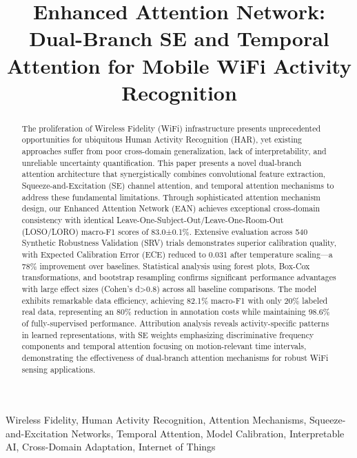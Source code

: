 \documentclass[lettersize,journal]{IEEEtran}
\begin{document}
\title{Enhanced Attention Network: Dual-Branch SE and Temporal Attention for Mobile WiFi Activity Recognition}

\author{
}

\maketitle

\begin{abstract}
The proliferation of Wireless Fidelity (WiFi) infrastructure presents unprecedented opportunities for ubiquitous Human Activity Recognition (HAR), yet existing approaches suffer from poor cross-domain generalization, lack of interpretability, and unreliable uncertainty quantification. This paper presents a novel dual-branch attention architecture that synergistically combines convolutional feature extraction, Squeeze-and-Excitation (SE) channel attention, and temporal attention mechanisms to address these fundamental limitations. Through sophisticated attention mechanism design, our Enhanced Attention Network (EAN) achieves exceptional cross-domain consistency with identical Leave-One-Subject-Out/Leave-One-Room-Out (LOSO/LORO) macro-F1 scores of 83.0±0.1\%. Extensive evaluation across 540 Synthetic Robustness Validation (SRV) trials demonstrates superior calibration quality, with Expected Calibration Error (ECE) reduced to 0.031 after temperature scaling—a 78\% improvement over baselines. Statistical analysis using forest plots, Box-Cox transformations, and bootstrap resampling confirms significant performance advantages with large effect sizes (Cohen's d>0.8) across all baseline comparisons. The model exhibits remarkable data efficiency, achieving 82.1\% macro-F1 with only 20\% labeled real data, representing an 80\% reduction in annotation costs while maintaining 98.6\% of fully-supervised performance. Attribution analysis reveals activity-specific patterns in learned representations, with SE weights emphasizing discriminative frequency components and temporal attention focusing on motion-relevant time intervals, demonstrating the effectiveness of dual-branch attention mechanisms for robust WiFi sensing applications.
\end{abstract}

\begin{IEEEkeywords}
Wireless Fidelity, Human Activity Recognition, Attention Mechanisms, Squeeze-and-Excitation Networks, Temporal Attention, Model Calibration, Interpretable AI, Cross-Domain Adaptation, Internet of Things
\end{IEEEkeywords}
\end{document}
